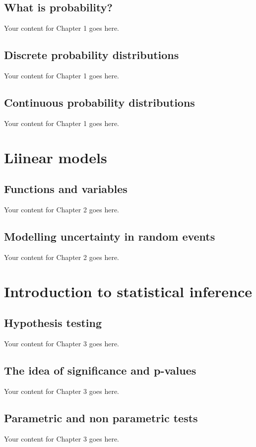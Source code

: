 \documentclass{book}
\begin{document}
\section{What is probability?}
Your content for Chapter 1 goes here.

\section{Discrete probability distributions}
Your content for Chapter 1 goes here.

\section{Continuous probability distributions}
Your content for Chapter 1 goes here.

\chapter{Liinear models}

\section{Functions and variables}
Your content for Chapter 2 goes here.

\section{Modelling uncertainty in random events}
Your content for Chapter 2 goes here.

\chapter{Introduction to statistical inference}

\section{Hypothesis testing}
Your content for Chapter 3 goes here.

\section{The idea of significance and p-values}
Your content for Chapter 3 goes here.

\section{Parametric and non parametric tests}
Your content for Chapter 3 goes here.
\end{document}
